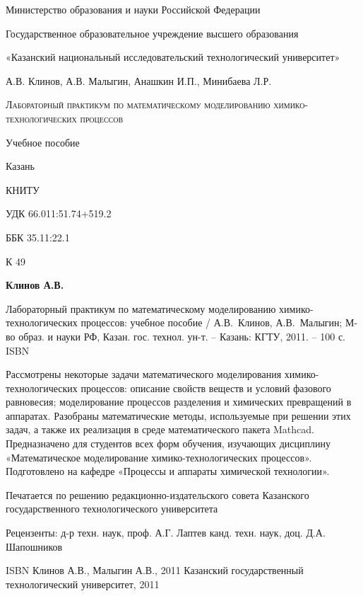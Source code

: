\begin{center}
Министерство образования и науки Российской Федерации

Государственное образовательное учреждение высшего образования

«Казанский национальный исследовательский технологический университет»
\vspace{3 cm}

А.В. Клинов, А.В. Малыгин, Анашкин И.П., Минибаева Л.Р.
\vspace{3 cm}

\textsc{Лабораторный практикум по математическому моделированию химико-технологических процессов}
\vspace{1 cm}

Учебное пособие
\vspace{4 cm}

Казань

КНИТУ

\number\year
\end{center}
\thispagestyle{empty}
\newpage

УДК 66.011:51.74+519.2

ББК 35.11:22.1

К 49

\textbf{Клинов А.В.}

Лабораторный практикум по математическому моделированию химико-технологических процессов: учебное пособие / А.В. Клинов, А.В. Малыгин; М-во образ. и науки РФ, Казан. гос. технол. ун-т. – Казань: КГТУ, 2011. – 100 с.
ISBN



Рассмотрены некоторые задачи математического моделирования химико-технологических процессов: описание свойств веществ и условий фазового равновесия; моделирование процессов разделения и химических превращений в аппаратах. Разобраны математические методы, используемые при решении этих задач, а также их реализация в среде математического пакета Mathcad. 
Предназначено для студентов всех форм обучения, изучающих дисциплину «Математическое моделирование химико-технологических процессов».
Подготовлено на кафедре «Процессы и аппараты химической технологии».

Печатается по решению редакционно-издательского совета Казанского государственного технологического университета





Рецензенты: д-р техн. наук, проф. А.Г. Лаптев
	         канд. техн. наук, доц. Д.А. Шапошников

ISBN 				 Клинов А.В., Малыгин А.В., 2011
				 Казанский государственный
технологический университет, 2011
\thispagestyle{empty}
\newpage
\tableofcontents
\newpage